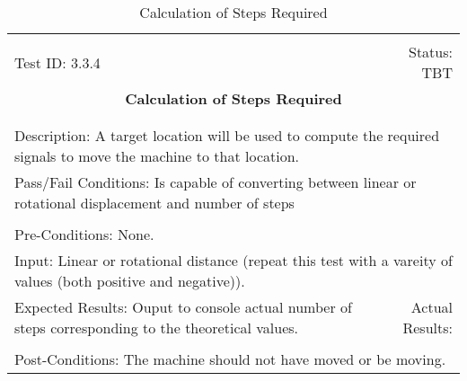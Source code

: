 \documentclass[titlepage]{article}
\begin{document}
\begin{center}%
\begin{table}[h!]
\begin{tabular}{|l r|}\hline&\\[-2mm]
	Test ID: 3.3.4	&Status: TBT\\[-3mm]
	\multicolumn{2}{|c|}{\textbf{\large{Calculation of Steps Required}}}\\&\\\hline&\\[-3mm]
	\multicolumn{2}{|p{\textwidth}|}{Description: A target location will be used to compute the required signals to move the machine to that location.}\\\hline
	\multicolumn{2}{|p{\textwidth}|}{Pass/Fail Conditions: Is capable of converting between linear or rotational displacement and number of steps}\\[1mm]\hline&\\[-3mm]
	\multicolumn{2}{|p{\textwidth}|}{Pre-Conditions: None.}\\[4mm]
	\multicolumn{2}{|p{\textwidth}|}{Input: Linear or rotational distance (repeat this test with a vareity of values (both positive and negative)).}\\[2mm]\hline
	\multicolumn{1}{|p{0.49\textwidth}}{Expected Results: Ouput to console actual number of steps corresponding to the theoretical values.}	&\multicolumn{1}{|p{0.45\textwidth}|}{Actual Results: }\\\hline&\\[-3mm]
	\multicolumn{2}{|p{\textwidth}|}{Post-Conditions: The machine should not have moved or be moving.}\\\hline
\end{tabular}
\caption{Calculation of Steps Required}
\end{table}
\end{center}
\end{document}
